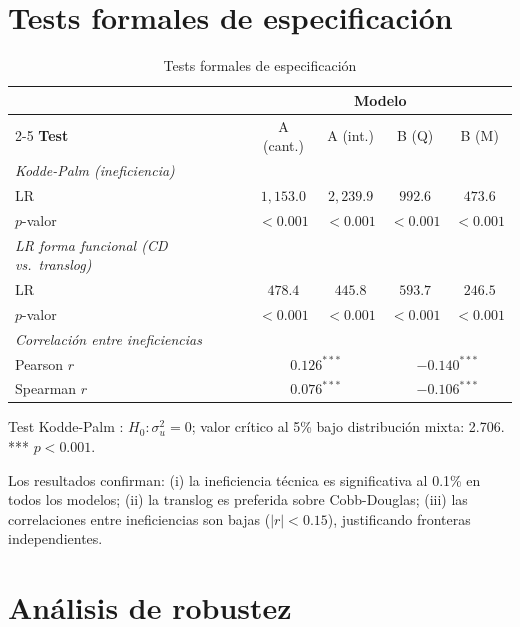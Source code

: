 \documentclass[12pt, a4paper, twoside, openright]{book}
\theoremstyle{plain}
\theoremstyle{definition}
\theoremstyle{remark}
\begin{document}
\section{Tests formales de especificación}

\begin{table}[htbp]
\centering
\caption{Tests formales de especificación}
\label{tab:tests_spec}
\begin{threeparttable}
\begin{tabular}{lcccc}
\toprule
& \multicolumn{4}{c}{\textbf{Modelo}} \\
\cmidrule{2-5}
\textbf{Test} & A (cant.) & A (int.) & B (Q) & B (M) \\
\midrule
\textit{Kodde-Palm (ineficiencia)} \\
\quad LR & $1{,}153.0$ & $2{,}239.9$ & $992.6$ & $473.6$ \\
\quad $p$-valor & $<0.001$ & $<0.001$ & $<0.001$ & $<0.001$ \\[4pt]
\textit{LR forma funcional (CD vs.\ translog)} \\
\quad LR & $478.4$ & $445.8$ & $593.7$ & $246.5$ \\
\quad $p$-valor & $<0.001$ & $<0.001$ & $<0.001$ & $<0.001$ \\[4pt]
\textit{Correlación entre ineficiencias} \\
\quad Pearson $r$ & \multicolumn{2}{c}{$0.126^{***}$}
  & \multicolumn{2}{c}{$-0.140^{***}$} \\
\quad Spearman $r$ & \multicolumn{2}{c}{$0.076^{***}$}
  & \multicolumn{2}{c}{$-0.106^{***}$} \\
\bottomrule
\end{tabular}
\begin{tablenotes}
  \small
  \item Test Kodde-Palm \citep{kodde1986}: $H_0: \sigma^2_u = 0$; valor crítico al 5\% bajo distribución mixta: 2.706. *** $p<0.001$.
\end{tablenotes}
\end{threeparttable}
\end{table}

Los resultados confirman: (i) la ineficiencia técnica es significativa al 0.1\% en todos los modelos; (ii) la translog es preferida sobre Cobb-Douglas; (iii) las correlaciones entre ineficiencias son bajas ($|r|<0.15$), justificando fronteras independientes.

\section{Análisis de robustez}
\end{document}
